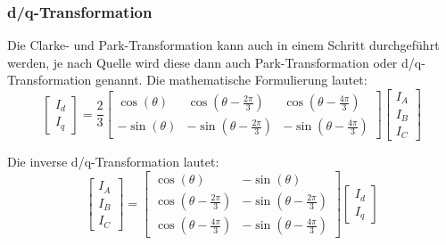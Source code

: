 \subsubsection*{d/q-Transformation} 
Die Clarke- und Park-Transformation kann auch in einem Schritt durchgeführt werden, je nach Quelle wird diese dann auch Park-Transformation oder d/q-Transformation genannt\cite{dqTrafo_Wiki}.
Die mathematische Formulierung lautet:
\begin{equation}\label{dqTrafo}
\left[
\begin{array}{c}
I_d \\ 
I_q
\end{array} 
\right]
= \frac{2}{3}
\left[
\begin{array}{ccc}
\cos (\theta) & \cos (\theta-\frac{2\pi}{3}) & \cos (\theta-\frac{4\pi}{3}) \\ 
-\sin (\theta) & -\sin (\theta-\frac{2\pi}{3}) & -\sin (\theta-\frac{4\pi}{3})
\end{array} 
\right] 
\left[
\begin{array}{c}
I_A \\ 
I_B \\
I_C
\end{array} 
\right]
\end{equation}

Die inverse d/q-Transformation lautet:
\begin{equation}\label{invdqTrafo}
\left[
\begin{array}{c}
I_A \\ 
I_B \\
I_C
\end{array} 
\right]
=
\left[
\begin{array}{cc}
\cos (\theta) & -\sin (\theta) \\
\cos (\theta-\frac{2\pi}{3}) & -\sin (\theta-\frac{2\pi}{3}) \\
\cos (\theta-\frac{4\pi}{3}) & -\sin (\theta-\frac{4\pi}{3}) 
\end{array} 
\right] 
\left[
\begin{array}{c}
I_d \\ 
I_q
\end{array} 
\right]
\end{equation}


